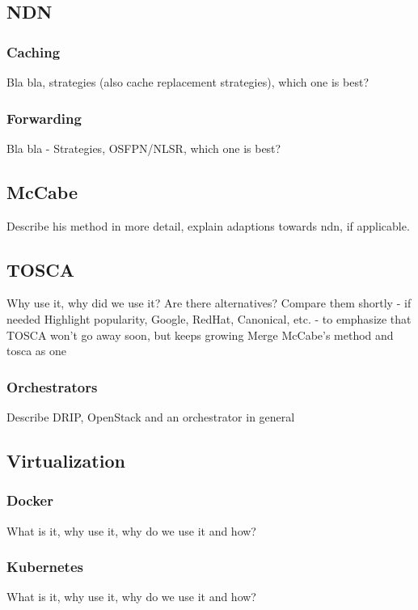 \subsection{NDN}
\label{overview-ndn}
\subsubsection{Caching}
Bla bla, strategies (also cache replacement strategies), which one is best?

\subsubsection{Forwarding}
Bla bla - Strategies, OSFPN/NLSR, which one is best?

\subsection{McCabe}
\label{overview-mccabe}
Describe his method in more detail, explain adaptions towards ndn, if applicable.

\subsection{TOSCA}
Why use it, why did we use it? Are there alternatives? Compare them shortly - if needed
Highlight popularity, Google, RedHat, Canonical, etc. - to emphasize that TOSCA won't go away soon, but keeps growing
Merge McCabe's method and tosca as one

\subsubsection{Orchestrators}
Describe DRIP, OpenStack and an orchestrator in general

\subsection{Virtualization}
\subsubsection{Docker}
What is it, why use it, why do we use it and how?

\subsubsection{Kubernetes}
What is it, why use it, why do we use it and how?